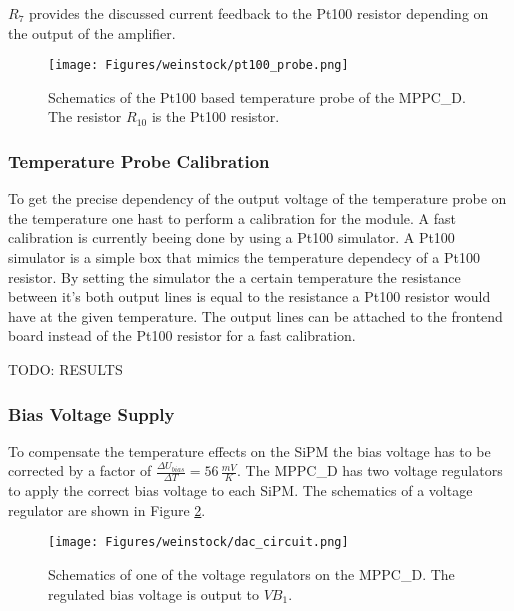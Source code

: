 \documentclass[]{article}
\begin{document}
$R_7$ provides the discussed current feedback to the Pt100 resistor depending on the output of the amplifier.

	\begin{figure}[]
		\centering
			\texttt{[image: Figures/weinstock/pt100\_probe.png]}
		\caption{Schematics of the Pt100 based temperature probe of the MPPC\_D. The resistor $R_{10}$ is the Pt100 resistor.}
		\label{pt100_probe}
	\end{figure}	
 
\subsubsection{Temperature Probe Calibration}

To get the precise dependency of the output voltage of the temperature probe on the temperature one hast to perform a calibration for the module. A fast calibration is currently beeing
done by using a Pt100 simulator. A Pt100 simulator is a simple box that mimics the temperature dependecy of a Pt100 resistor. By setting the simulator the a certain temperature the 
resistance between it's both output lines is equal to the resistance a Pt100 resistor would have at the given temperature. The output lines can be attached to the frontend board
instead of the Pt100 resistor for a fast calibration.

TODO: RESULTS

\newpage

\subsubsection{Bias Voltage Supply}

To compensate the temperature effects on the SiPM the bias voltage has to be corrected by a factor of $\frac{\Delta U_{bias}}{\Delta T} = 56\,\frac{mV}{K}$. The MPPC\_D has two 
voltage regulators to apply the correct bias voltage to each SiPM. The schematics of a voltage regulator are shown in Figure \ref{voltage_regulator}. 
	
	\begin{figure}[]
		\centering
			\texttt{[image: Figures/weinstock/dac\_circuit.png]}
		\caption{Schematics of one of the voltage regulators on the MPPC\_D. The regulated bias voltage is output to $VB_1$.}
		\label{voltage_regulator}
	\end{figure}	
\end{document}
